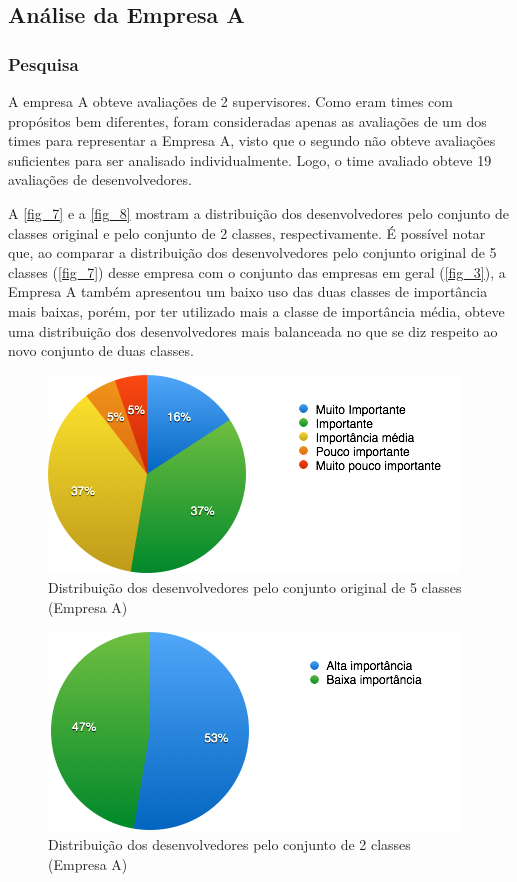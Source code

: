 \subsection{Análise da Empresa A}

\subsubsection{Pesquisa}

A empresa A obteve avaliações de 2 supervisores. Como eram times com propósitos bem diferentes, foram consideradas apenas as avaliações de um dos times para representar a Empresa A, visto que o segundo não obteve avaliações suficientes para ser analisado individualmente. Logo, o time avaliado obteve 19 avaliações de desenvolvedores.

A \autoref{fig_7} e a \autoref{fig_8} mostram a distribuição dos desenvolvedores pelo conjunto de classes original e pelo conjunto de 2 classes, respectivamente. É possível notar que, ao comparar a distribuição dos desenvolvedores pelo conjunto original de 5 classes (\autoref{fig_7}) desse empresa com o conjunto das empresas em geral (\autoref{fig_3}), a Empresa A também apresentou um baixo uso das duas classes de importância mais baixas, porém, por ter utilizado mais a classe de importância média, obteve uma distribuição dos desenvolvedores mais balanceada no que se diz respeito ao novo conjunto de duas classes.

\begin{figure}[h]
	\centering
	\includegraphics[scale=0.8]{figs/empresa_a/imagem-classe-original.png}
	\caption{\label{fig_7}Distribuição dos desenvolvedores pelo conjunto original de 5 classes (Empresa A)}
\end{figure}

\begin{figure}[h]
	\centering
	\includegraphics[scale=0.8]{figs/empresa_a/imagem-classe-alternativa.png}
	\caption{\label{fig_8}Distribuição dos desenvolvedores pelo conjunto de 2 classes (Empresa A)}
\end{figure}

